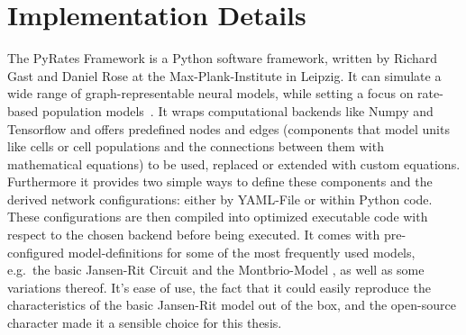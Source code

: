 
\section{Implementation Details}\label{sec:pyrates-framework}
The PyRates Framework is a Python software framework, written by Richard Gast and Daniel Rose at
the Max-Plank-Institute in Leipzig.
It can simulate a wide range of graph-representable neural models,
while setting a focus on rate-based population models~\parencite{gast_pyratespython_2019}.
It wraps computational backends like Numpy and Tensorflow and offers predefined nodes and
edges (components that model units like cells or cell populations and the
connections between them with mathematical equations) to be used,
replaced or extended with custom equations.
Furthermore it provides two simple ways to define these components and the derived network configurations:
either by YAML-File or within Python code.
These configurations are then compiled into optimized executable code with respect to
the chosen backend before being executed.
It comes with pre-configured model-definitions for some of the most frequently used models, e.g.\ the basic
Jansen-Rit Circuit \parencite{jansen_electroencephalogram_1995} and the
Montbrio-Model \parencite{montbrio_macroscopic_2015}, as well as some variations thereof.
It's ease of use, the fact that it could easily reproduce the characteristics of
the basic Jansen-Rit model out of the box, and the open-source character made it a sensible choice for this thesis.
%
%
%
%
%
%
%
%

